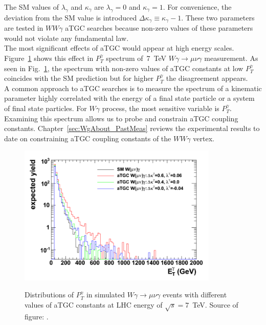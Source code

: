 The SM values of $\lambda_\gamma$ and $\kappa_\gamma$ are $\lambda_\gamma=0$ and $\kappa_\gamma=1$. For convenience, the deviation from the SM value is introduced $\Delta \kappa_\gamma \equiv \kappa_\gamma-1$. These two parameters are tested in $WW\gamma$ aTGC searches because non-zero values of these parameters would not violate any fundamental law.\\

The most significant effects of aTGC would appear at high energy scales. Figure~\ref{fig:aTGC_Pt_Wg} shows this effect in $P_T^\gamma$ spectrum of~7~TeV $W\gamma \rightarrow \mu\nu\gamma$ measurement. As seen in Fig.~\ref{fig:aTGC_Pt_Wg}, the spectrum with non-zero values of aTGC constants at low $P_T^{\gamma}$ coincides with the SM prediction but for higher $P_T^{\gamma}$ the disagreement appears.\\

A common approach to aTGC searches is to measure the spectrum of a kinematic parameter highly correlated with the energy of a final state particle or a system of final state particles. For $W\gamma$ process, the most sensitive variable is $P_T^\gamma$. Examining this spectrum allows us to probe and constrain aTGC coupling constants. Chapter~\ref{sec:WgAbout_PastMeas} reviews the experimental results to date on constraining aTGC coupling constants of the $WW\gamma$ vertex.\\ 

\begin{figure}[htb]
  \begin{center}
    {\includegraphics[width=0.85\textwidth]{../figs/WgAbout/aTGC_Pt_Wg.png}}
    \caption{Distributions of $P_T^\gamma$ in simulated $W\gamma\rightarrow\mu\nu\gamma$ events with different values of aTGC constants at LHC energy of $\sqrt{s}=7$~TeV. Source of figure:  \cite{ref_Senka_thesis}.}
    \label{fig:aTGC_Pt_Wg}
  \end{center}
\end{figure}

